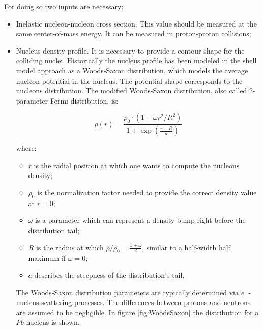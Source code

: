 For doing so two inputs are necessary:
\begin{itemize}
\item Inelastic nucleon-nucleon cross section. 
This value should be measured at the same center-of-mass energy. 
It can be measured in proton-proton collisions;
\item Nucleus density profile. It is necessary to provide a contour shape for the colliding nuclei. 
Historically the nucleus profile has been modeled in the shell model approach as a Woods-Saxon distribution, which models the average nucleon potential in the nucleus. 
The potential shape corresponds to the nucleons distribution.
The modified Woods-Saxon distribution, also called 2-parameter Fermi distribution, is:

\begin{equation}
\label{eq:WoodsSaxon}
\rho(r) = \frac{\rho_0\cdot(1+\omega r^2/R^2)}{1+\exp(\frac{r-R}{a})}
\end{equation}

where:
\begin{itemize}
\item $r$ is the radial position at which one wants to compute the nucleons density;
\item $\rho_0$ is the normalization factor needed to provide the correct density value at $r=0$;
\item $\omega$ is a parameter which can represent a density bump right before the distribution tail;
\item $R$ is the radius at which $\rho/\rho_0=\frac{1+\omega}{2}$, similar to a half-width half maximum if $\omega=0$;
\item $a$ describes the steepness of the distribution's tail.
\end{itemize}
The Woods-Saxon distribution parameters are typically determined via $e^-$-nucleus scattering processes.
The differences between protons and neutrons are assumed to be negligible.
In figure \ref{fig:WoodsSaxon} the distribution for a $Pb$ nucleus is shown.

\end{itemize}

